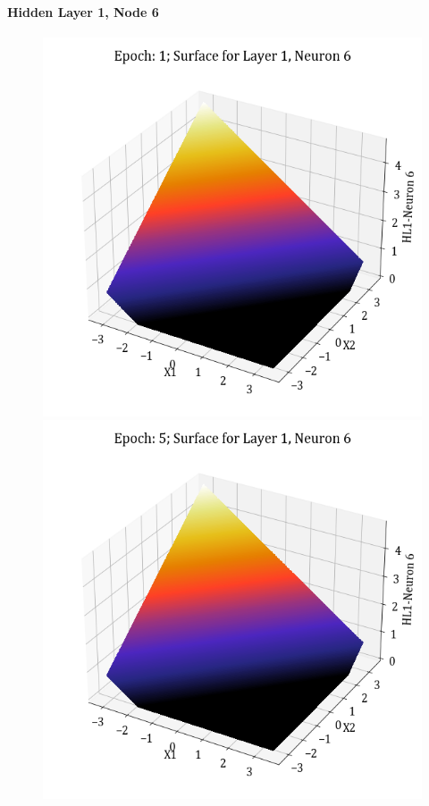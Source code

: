 \documentclass[11pt,a4paper]{article}
\begin{document}
\paragraph{Hidden Layer 1, Node 6}
\begin{figure}[H]
    \centering
    \includegraphics[scale=0.4]{images/1B_MLFFNN_E1_HL1_N6.png}
    \includegraphics[scale=0.4]{images/1B_MLFFNN_E5_HL1_N6.png}

\end{figure}
\end{document}
